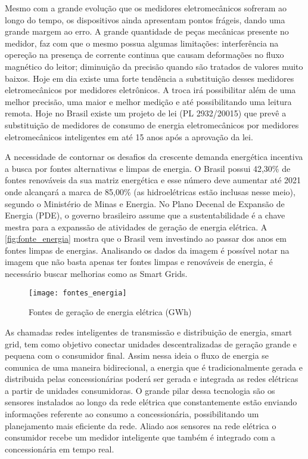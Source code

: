 Mesmo com a grande evolução que os medidores eletromecânicos sofreram ao longo do tempo, os dispositivos ainda apresentam pontos frágeis, dando uma 
grande margem ao erro. A grande quantidade de peças mecânicas presente no medidor, faz com que o mesmo possua algumas limitações: interferência na
opereção na presença de corrente continua que causam deformações no fluxo magnético do leitor; diminuição da precisão quando são tratados de valores
muito baixos. Hoje em dia existe uma forte tendência a substituição desses medidores eletromecânicos por medidores eletrônicos. A troca irá possibilitar além de uma
melhor precisão, uma maior e melhor medição e até possibilitando uma leitura remota. Hoje no Brasil existe um projeto de lei (PL 2932/20015) que prevê
a substituição de medidores de consumo de energia eletromecânicos por medidores eletromecânicos inteligentes em até 15 anos após a aprovação da lei.


A necessidade de contornar os desafios da crescente demanda energética incentiva a busca por fontes alternativas e limpas de energia. O Brasil 
possui 42,30\% de fontes renováveis da sua matriz energética e esse número deve aumentar até 2021 onde alcançará a marca de 85,00\% (as hidroelétricas
estão inclusas nesse meio), segundo o Ministério de Minas e Energia. No Plano Decenal de Expansão de Energia (PDE), o governo brasileiro
assume que a sustentabilidade é a chave mestra para a expanssão de atividades de geração de energia elétrica. A \autoref{fig:fonte_energia} mostra
que o Brasil vem investindo ao passar dos anos em fontes limpas de energias. Analisando os dados da imagem é possível notar na imagem que não basta apenas ter fontes limpas
e renováveis de energia, é necessário buscar melhorias como as Smart Grids.

\begin{figure}[h!]
	\texttt{[image: fontes\_energia]}
	\centering
	\caption[Fontes de geração de energia elétrica (GWh)]{Fontes de geração de energia elétrica (GWh)}
	\label{fig:fonte_energia}
\end{figure}
\FloatBarrier

As chamadas redes inteligentes de transmissão e distribuição de energia, smart grid, tem como objetivo conectar unidades descentralizadas de geração
grande e pequena com o consumidor final. Assim nessa ideia o fluxo de energia se comunica de uma maneira bidirecional, a energia que é tradicionalmente
gerada e distribuida pelas concessionárias poderá ser gerada e integrada as redes elétricas a partir de unidades consumidoras. O grande pilar dessa 
tecnologia são os sensores instalados ao longo da rede elétrica que constantemente estão enviando informações referente ao consumo a concessionária,
possibilitando um planejamento mais eficiente da rede. Aliado aos sensores na rede elétrica o consumidor recebe um medidor inteligente que também
é integrado com a concessionária em tempo real.

